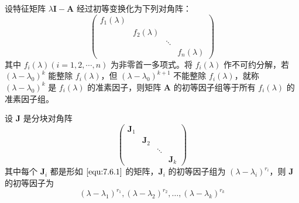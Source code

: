 \begin{lemma}
    设特征矩阵 $\lambda \bm{I} - \bm{A}$ 经过初等变换化为下列对角阵：
    \begin{equation*}
        \begin{pmatrix}
            f_{1}(\lambda) & \              & \      & \              \\
            \              & f_{2}(\lambda) & \      & \              \\
            \              & \              & \ddots & \              \\
            \              & \              & \      & f_{n}(\lambda)
        \end{pmatrix}
    \end{equation*}
    其中 $f_{i}(\lambda)(i = 1, 2, \cdots, n)$ 为非零首一多项式。将 $f_{i}(\lambda)$ 作不可约分解，若 $(\lambda - \lambda_0)^k$ 能整除 $f_{i}(\lambda)$，但 $(\lambda - \lambda_0)^{k + 1}$ 不能整除 $f_{i}(\lambda)$，就称 $(\lambda - \lambda_0)^k$ 是 $f_{i}(\lambda)$ 的准素因子，则矩阵 $\bm{A}$ 的初等因子组等于所有 $f_{i}(\lambda)$ 的准素因子组。
\end{lemma}

\begin{lemma}
    设 $\bm{J}$ 是分块对角阵
    \[
        \begin{pmatrix}
            \bm{J}_1 & \        & \      & \        \\
            \        & \bm{J}_2 & \      & \        \\
            \        & \        & \ddots & \        \\
            \        & \        & \      & \bm{J}_k
        \end{pmatrix}
    \]
    其中每个 $\bm{J}_i$ 都是形如 $\ref{equ:7.6.1}$ 的矩阵，$\bm{J}_i$ 的初等因子组为 $(\lambda - \lambda_i)^{r_i}$，则 $\bm{J}$ 的初等因子为
    \[
        (\lambda - \lambda_1)^{r_1}, (\lambda - \lambda_2)^{r_2}, \ldots, (\lambda - \lambda_k)^{r_k}
    \]
\end{lemma}

